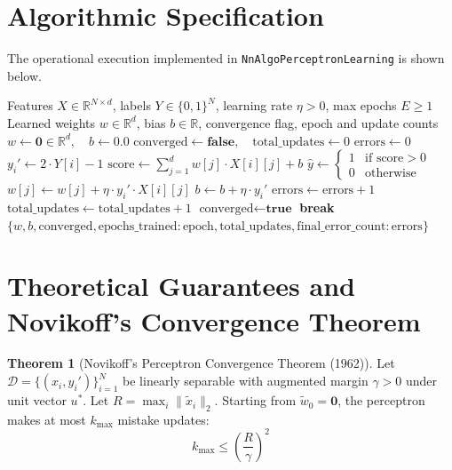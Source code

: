 \documentclass[11pt,a4paper]{article}
\theoremstyle{definition}
\newtheorem{theorem}{Theorem}[section]
\begin{document}
\section{Algorithmic Specification}

The operational execution implemented in \texttt{NnAlgoPerceptronLearning} is shown below.

\begin{algorithm}[H]
\caption{Perceptron Learning Algorithm}
\begin{algorithmic}[1]
\Require Features $X \in \mathbb{R}^{N \times d}$, labels $Y \in \{0, 1\}^N$, learning rate $\eta > 0$, max epochs $E \ge 1$
\Ensure Learned weights $w \in \mathbb{R}^d$, bias $b \in \mathbb{R}$, convergence flag, epoch and update counts
\State $w \gets \mathbf{0} \in \mathbb{R}^d, \quad b \gets 0.0$
\State $\text{converged} \gets \textbf{false}, \quad \text{total\_updates} \gets 0$
    \State $\text{errors} \gets 0$
        \State $y_i' \gets 2 \cdot Y[i] - 1$
        \State $\text{score} \gets \sum_{j=1}^d w[j] \cdot X[i][j] + b$
        \State $\hat{y} \gets \begin{cases} 1 & \text{if } \text{score} > 0 \\ 0 & \text{otherwise} \end{cases}$
                \State $w[j] \gets w[j] + \eta \cdot y_i' \cdot X[i][j]$
            \EndFor
            \State $b \gets b + \eta \cdot y_i'$
            \State $\text{errors} \gets \text{errors} + 1$
            \State $\text{total\_updates} \gets \text{total\_updates} + 1$
        \EndIf
    \EndFor
        \State $\text{converged} \gets \textbf{true}$
        \State \textbf{break}
    \EndIf
\EndFor
\State \Return $\{w, b, \text{converged}, \text{epochs\_trained}: \text{epoch}, \text{total\_updates}, \text{final\_error\_count}: \text{errors}\}$
\end{algorithmic}
\end{algorithm}

\section{Theoretical Guarantees and Novikoff's Convergence Theorem}

\begin{theorem}[Novikoff's Perceptron Convergence Theorem (1962)]
Let $\mathcal{D} = \{(x_i, y_i')\}_{i=1}^N$ be linearly separable with augmented margin $\gamma > 0$ under unit vector $u^*$. Let $R = \max_i \|\tilde{x}_i\|_2$. Starting from $\tilde{w}_0 = \mathbf{0}$, the perceptron makes at most $k_{\max}$ mistake updates:
\begin{equation}
k_{\max} \le \left(\frac{R}{\gamma}\right)^2
\end{equation}
\end{theorem}
\end{document}

